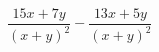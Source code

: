 \begin{ex}
	\begin{condition}
		\( \dfrac{15x+7y}{(x+y)^2}-\dfrac{13x+5y}{(x+y)^2} \)
	\end{condition}
\end{ex}